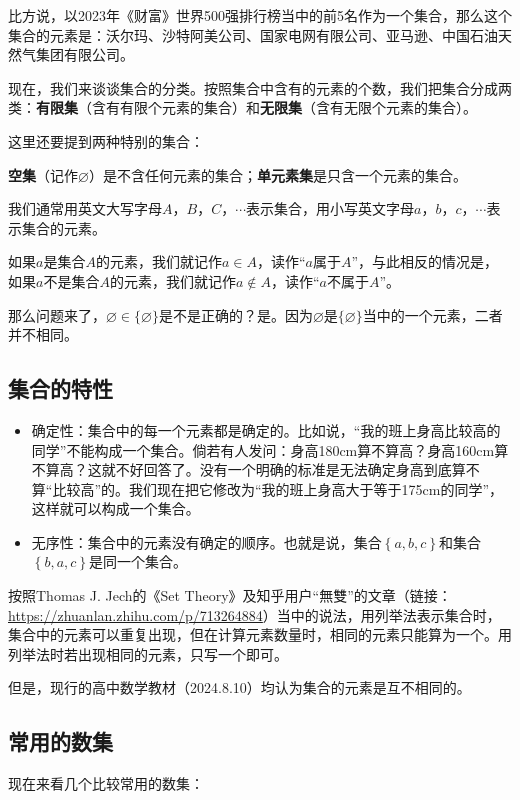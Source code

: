 \documentclass[lang=cn,math=cm,chinesefont=nofont,11pt,scheme=chinese,onecol]{elegantbook}
\begin{document}
比方说，以2023年《财富》世界500强排行榜当中的前5名作为一个集合，那么这个集合的元素是：沃尔玛、沙特阿美公司、国家电网有限公司、亚马逊、中国石油天然气集团有限公司。

现在，我们来谈谈集合的分类。按照集合中含有的元素的个数，我们把集合分成两类：\textbf{有限集}（含有有限个元素的集合）和\textbf{无限集}（含有无限个元素的集合）。

这里还要提到两种特别的集合：

\textbf{空集}（记作$\varnothing$）是不含任何元素的集合；\textbf{单元素集}是只含一个元素的集合。

\hspace*{\fill}

我们通常用英文大写字母$A$，$B$，$C$，$\cdots$表示集合，用小写英文字母$a$，$b$，$c$，$\cdots$表示集合的元素。

如果$a$是集合$A$的元素，我们就记作$a\in A$，读作“$a$属于$A$”，与此相反的情况是，如果$a$不是集合$A$的元素，我们就记作$a\notin A$，读作“$a$不属于$A$”。

那么问题来了，$\varnothing \in \{\varnothing\}$是不是正确的？是。因为$\varnothing$是$\{\varnothing\}$当中的一个元素，二者并不相同。

\subsection{集合的特性}

\begin{itemize}
  \item 确定性：集合中的每一个元素都是确定的。比如说，“我的班上身高比较高的同学”不能构成一个集合。倘若有人发问：身高180cm算不算高？身高160cm算不算高？这就不好回答了。没有一个明确的标准是无法确定身高到底算不算“比较高”的。我们现在把它修改为“我的班上身高大于等于175cm的同学”，这样就可以构成一个集合。
  
  \item 无序性：集合中的元素没有确定的顺序。也就是说，集合$\left\{a,b,c \right\}$和集合$\left\{b,a,c \right\}$是同一个集合。
\end{itemize}

按照Thomas J. Jech的《Set Theory》及知乎用户“無雙”的文章（链接：\href{https://zhuanlan.zhihu.com/p/713264884}{https://zhuanlan.zhihu.com/p/713264884}）当中的说法，用列举法表示集合时，集合中的元素可以重复出现，但在计算元素数量时，相同的元素只能算为一个。用列举法时若出现相同的元素，只写一个即可。

但是，现行的高中数学教材（2024.8.10）均认为集合的元素是互不相同的。

\subsection{常用的数集}
现在来看几个比较常用的数集：
\end{document}
